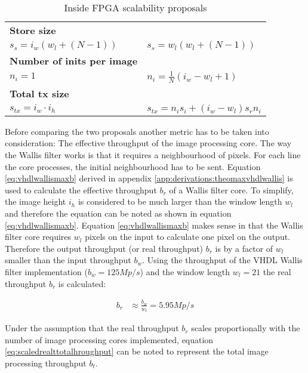 \begin{table}[b!]
\begin{tabular}{p{} p{}}
        \textbf{Store size} & \\
        {\( 
            s_s  = i_w(w_l+(N-1))
        \)}
        &
        {\( 
            s_s  = w_l(w_l+(N-1))
        \)}
        \\\midrule
        \textbf{Number of inits per image} & \\
        {\( 
            n_i  = 1
        \)}
        &
        {\( 
            n_i  = \frac{1}{N}(i_w-w_l+1)
        \)}
        \\\midrule
        \textbf{Total tx size} & \\
        {\( 
            s_{tx}  = i_w \cdot i_h
        \)}
        &
        {\( 
            s_{tx}  = n_i s_i + (i_w-w_l)s_r n_i
        \)}
        \\
        \bottomrule
    \end{tabular}
    \caption{Inside FPGA scalability proposals}
    \label{tab:insidefpgascalability}
\end{table}
\clearpage
Before comparing the two proposals another metric has to be taken into
consideration: The effective throughput of the image processing core. The way
the Wallis filter works is that it requires a neighbourhood of pixels. For each
line the core processes, the initial neighbourhood has to be sent. Equation
\ref{eq:vhdlwallismaxb} derived in appendix 
\ref{app:derivations:theomaxvhdlwallis} is used to calculate the effective
throughput $b_r$ of a Wallis filter core. To simplify, the image height $i_h$ is
considered to be much larger than the window length $w_l$ and therefore the
equation can be noted as shown in equation \ref{eq:vhdlwallismaxb}.
Equation \ref{eq:vhdlwallismaxb} makes sense in that the Wallis filter core
requires $w_l$ pixels on the input to calculate one pixel on the output.
Therefore the output throughput (or real throughput) $b_r$ is by a factor of $w_l$
smaller than the input throughput $b_w$. Using the
throughput of the VHDL Wallis filter implementation ($b_w=125Mp/s$) and the
window length $w_l=21$ the real throughput $b_r$ is calculated:

\begin{align}
    b_r  & \approx \frac{b_w}{w_l} = 5.95 Mp/s
    \label{eq:vhdlwallismaxb}
\end{align}

Under the assumption that the real throughput $b_r$ scales proportionally with the
number of image processing cores implemented, equation 
\ref{eq:scaledrealttotalhroughput} can be noted to represent the total image
processing throughput $b_t$.

